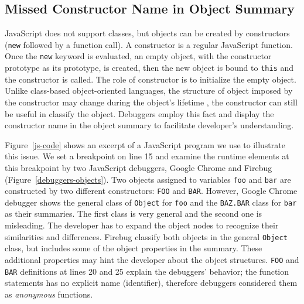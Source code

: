 \documentclass[10pt, preprint]{sigplanconf}
\begin{document}
\subsection{Missed Constructor Name in Object Summary}
JavaScript does not support classes, but objects can be created by constructors ({\small\texttt{new}} followed by a function call). A constructor is a regular JavaScript function. Once the {\small\texttt{new}} keyword is evaluated, an empty object, with the constructor prototype as its prototype, is created, then the new object is bound to {\small\texttt{this}} and the constructor is called. The role of constructor is to initialize the empty object. Unlike class-based object-oriented languages, the structure of object imposed by the constructor may change during the object's lifetime \cite{Richards}, the constructor can still be useful in classify the object.
Debuggers employ this fact and display the constructor name in the object summary to facilitate developer's understanding. 

Figure~\ref{js-code} shows an excerpt of a JavaScript program we use to illustrate this issue. We set a breakpoint on line 15 and examine the runtime elements at this breakpoint by two JavaScript debuggers, Google Chrome and Firebug (Figure~\ref{debuggers-objects}). Two objects assigned to variables {\small\texttt{foo}} and {\small\texttt{bar}} are constructed by two different constructors: {\small\texttt{FOO}} and {\small\texttt{BAR}}. However, Google Chrome debugger shows the general class of {\small\texttt{Object}} for {\small\texttt{foo}} and the {\small\texttt{BAZ.BAR}} class for {\small\texttt{bar}} as their summaries. The first class is very general and the second one is misleading. The developer has to expand the object nodes to recognize their similarities and differences. Firebug classify both objects in the general {\small\texttt{Object}} class, but includes some of the object properties in the summary. These additional properties may hint the developer about the object structures. {\small\texttt{FOO}} and {\small\texttt{BAR}} definitions at lines 20 and 25 explain the debuggers' behavior; the function statements has no explicit name (identifier), therefore debuggers considered them as \textit{anonymous} functions. 
\end{document}

